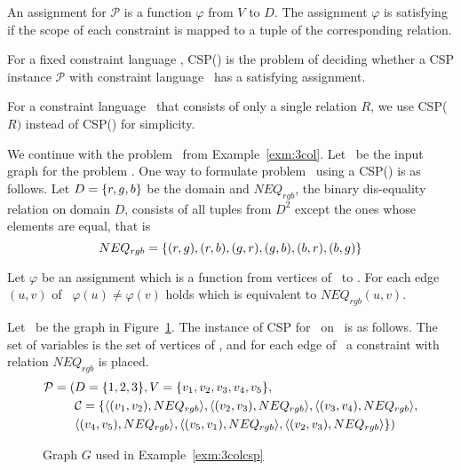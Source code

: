 An assignment for \(\mathcal{P}\) is a function \(\varphi\) from \(V\) to \(D\)\@. The assignment
\(\varphi\) is satisfying if the scope of each constraint is
mapped to a tuple of the corresponding relation.

\begin{defi}
For a fixed constraint language \mrelset, CSP(\mrelset) is the problem of deciding 
whether a CSP instance \(\mathcal{P}\) with constraint language \mrelset\
has a satisfying assignment.
\end{defi}

For a constraint language \mrelset\ that consists of only a single relation \(R\),
we use CSP(\(R)\) instead of CSP(\mrelset) for simplicity.

\begin{example}[\tcoloring]\label{exm:3colcsp}
We continue with the problem \tcoloring\ from Example~\ref{exm:3col}.
Let \mG\ be the input graph for the problem \tcoloring\@.
One way to formulate problem \tcoloring\ using a CSP(\mrelset) is as follows.
Let \(D=\{{r,g,b}\}\) be the domain and \(NEQ_{rgb}\), the binary dis-equality relation on domain \(D\)\@, consists of all tuples from \(D^2\) except the ones whose elements are equal, that is
\[NEQ_{rgb}=\{{(r,g),(r,b),(g,r),(g,b),(b,r), (b,g)}\}\]

Let \(\varphi\) be an assignment which is a function from vertices of \mG\ to \mD\@.
For each edge \((u,v)\) of \mG\, \(\varphi(u)\neq\varphi(v)\) holds which is
equivalent to \(NEQ_{rgb}(u,v)\)\@.

Let \mG\ be the graph in Figure~\ref{fig:sample}. The instance of 
CSP for \tcoloring\ on \mG\ is as follows. The set of variables is the set of vertices of \mG,
and for each edge of \mG\ a constraint with relation \(NEQ_{rgb}\) is placed.
\begin{align*}
\mathcal{P}=(&D=\{{1,2,3}\},V=\{{v_1,v_2,v_3,v_4,v_5}\}, \\
&\mathcal{C}=\{\langle (v_1,v_2),NEQ_{rgb} \rangle, \langle (v_2,v_3),NEQ_{rgb} \rangle,\langle (v_3,v_4),NEQ_{rgb} \rangle,\\
&\langle (v_4,v_5),NEQ_{rgb} \rangle, \langle (v_5,v_1),NEQ_{rgb} \rangle,
\langle (v_2,v_3),NEQ_{rgb} \rangle\})
\end{align*}
\end{example}

\begin{figure}
\centering

\caption{Graph \ensuremath{G} used in Example~\ref{exm:3colcsp}}
\label{fig:sample}
\end{figure}

